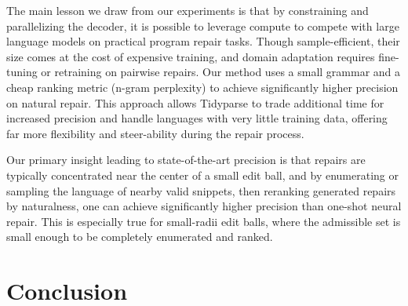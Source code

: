 \documentclass[runningheads]{llncs}
\makeatletter
\def\squigglyred{\bgroup \markoverwith{\textcolor{red}{\lower3\p@\hbox{\sixly \char58}}}\ULon}
\newcommand{\err}[1]{\smash{\squigglyred{#1}{}}}
\makeatother
\begin{document}
%
%

The main lesson we draw from our experiments is that by constraining and parallelizing the decoder, it is possible to leverage compute to compete with large language models on practical program repair tasks. Though sample-efficient, their size comes at the cost of expensive training, and domain adaptation requires fine-tuning or retraining on pairwise repairs. Our method uses a small grammar and a cheap ranking metric (n-gram perplexity) to achieve significantly higher precision on natural repair. This approach allows Tidyparse to trade additional time for increased precision and handle languages with very little training data, offering far more flexibility and steer-ability during the repair process.

Our primary insight leading to state-of-the-art precision is that repairs are typically concentrated near the center of a small edit ball, and by enumerating or sampling the language of nearby valid snippets, then reranking generated repairs by naturalness, one can achieve significantly higher precision than one-shot neural repair. This is especially true for small-radii edit balls, where the admissible set is small enough to be completely enumerated and ranked.

\section{Conclusion}
\end{document}
